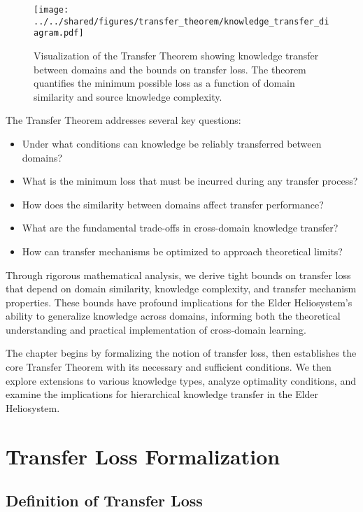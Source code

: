 \begin{figure}[ht]
    \centering
    \texttt{[image: ../../shared/figures/transfer\_theorem/knowledge\_transfer\_diagram.pdf]}
    \caption{Visualization of the Transfer Theorem showing knowledge transfer between domains and the bounds on transfer loss. The theorem quantifies the minimum possible loss as a function of domain similarity and source knowledge complexity.}
    \label{fig:transfer_theorem_diagram}
\end{figure}

The Transfer Theorem addresses several key questions:
\begin{itemize}
    \item Under what conditions can knowledge be reliably transferred between domains?
    \item What is the minimum loss that must be incurred during any transfer process?
    \item How does the similarity between domains affect transfer performance?
    \item What are the fundamental trade-offs in cross-domain knowledge transfer?
    \item How can transfer mechanisms be optimized to approach theoretical limits?
\end{itemize}

Through rigorous mathematical analysis, we derive tight bounds on transfer loss that depend on domain similarity, knowledge complexity, and transfer mechanism properties. These bounds have profound implications for the Elder Heliosystem's ability to generalize knowledge across domains, informing both the theoretical understanding and practical implementation of cross-domain learning.

The chapter begins by formalizing the notion of transfer loss, then establishes the core Transfer Theorem with its necessary and sufficient conditions. We then explore extensions to various knowledge types, analyze optimality conditions, and examine the implications for hierarchical knowledge transfer in the Elder Heliosystem.

\section{Transfer Loss Formalization}

\subsection{Definition of Transfer Loss}

